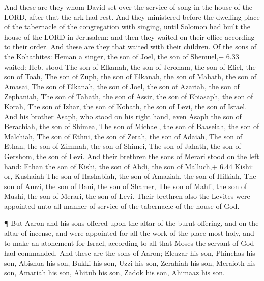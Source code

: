  And these are they whom David set over the service of song
in the house of the LORD, after that the ark had rest.  And
they ministered before the dwelling place of the tabernacle of the
congregation with singing, until Solomon had built the house of the LORD
in Jerusalem: and then they waited on their office according to their
order.  And these are they that waited with their children.
Of the sons of the Kohathites: Heman a singer, the son of Joel, the son
of Shemuel,+ 6.33 waited: Heb. stood  The son of Elkanah,
the son of Jeroham, the son of Eliel, the son of Toah,  The
son of Zuph, the son of Elkanah, the son of Mahath, the son of Amasai,
 The son of Elkanah, the son of Joel, the son of Azariah,
the son of Zephaniah,  The son of Tahath, the son of Assir,
the son of Ebiasaph, the son of Korah,  The son of Izhar,
the son of Kohath, the son of Levi, the son of Israel.  And
his brother Asaph, who stood on his right hand, even Asaph the son of
Berachiah, the son of Shimea,  The son of Michael, the son
of Baaseiah, the son of Malchiah,  The son of Ethni, the
son of Zerah, the son of Adaiah,  The son of Ethan, the son
of Zimmah, the son of Shimei,  The son of Jahath, the son
of Gershom, the son of Levi.  And their brethren the sons
of Merari stood on the left hand: Ethan the son of Kishi, the son of
Abdi, the son of Malluch,+ 6.44 Kishi: or, Kushaiah  The
son of Hashabiah, the son of Amaziah, the son of Hilkiah, 
The son of Amzi, the son of Bani, the son of Shamer,  The
son of Mahli, the son of Mushi, the son of Merari, the son of Levi.
 Their brethren also the Levites were appointed unto all
manner of service of the tabernacle of the house of God.

 ¶ But Aaron and his sons offered upon the altar of the
burnt offering, and on the altar of incense, and were appointed for all
the work of the place most holy, and to make an atonement for Israel,
according to all that Moses the servant of God had commanded.
 And these are the sons of Aaron; Eleazar his son, Phinehas
his son, Abishua his son,  Bukki his son, Uzzi his son,
Zerahiah his son,  Meraioth his son, Amariah his son,
Ahitub his son,  Zadok his son, Ahimaaz his son.

